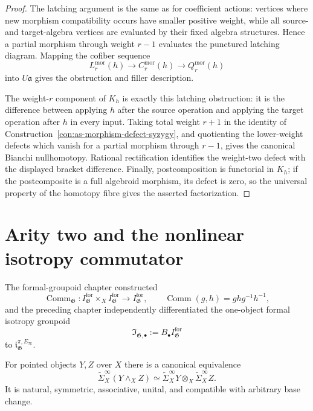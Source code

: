 \begin{proof}
The latching argument is the same as for coefficient actions: vertices where
new morphism compatibility occurs have smaller positive weight, while all
source- and target-algebra vertices are evaluated by their fixed algebra
structures.  Hence a partial morphism through weight $r-1$ evaluates the
punctured latching diagram.  Mapping the cofiber sequence
\[
    L_r^{\mathrm{mor}}(h)
    \longrightarrow
    C_r^{\mathrm{mor}}(h)
    \longrightarrow
    Q_r^{\mathrm{mor}}(h)
\]
into $U\mathfrak a$ gives the obstruction and filler description.

The weight-$r$ component of $K_h$ is exactly this latching obstruction: it is
the difference between applying $h$ after the source operation and applying
the target operation after $h$ in every input.  Taking total weight $r+1$ in
the identity of
Construction~\ref{con:as-morphism-defect-syzygy}, and quotienting the
lower-weight defects which vanish for a partial morphism through $r-1$, gives
the canonical Bianchi nullhomotopy.  Rational rectification identifies the
weight-two defect with the displayed bracket difference.  Finally,
postcomposition is functorial in $K_h$; if the postcomposite is a full
algebroid morphism, its defect is zero, so the universal property of the
homotopy fibre gives the asserted factorization.
\end{proof}

\section{Arity two and the nonlinear isotropy commutator}
\label{sec:as-binary-commutator}

The formal-groupoid chapter constructed
\[
    \operatorname{Comm}_{\mathfrak G}:
    I_{\mathfrak G}^{\mathrm{for}}
    \times_X
    I_{\mathfrak G}^{\mathrm{for}}
    \longrightarrow
    I_{\mathfrak G}^{\mathrm{for}},
    \qquad
    \operatorname{Comm}(g,h)=ghg^{-1}h^{-1},
\]
and the preceding chapter independently differentiated the one-object formal
isotropy groupoid
\[
    \mathfrak I_{\mathfrak G,\bullet}
    :=
    B_\bullet I_{\mathfrak G}^{\mathrm{for}}
\]
to
$\mathfrak i_{\mathfrak G}^{\pi,E_\infty}$.

\begin{lemma}
\label{lem:as-reduced-stabilization-monoidal}
For pointed objects $Y,Z$ over $X$ there is a canonical equivalence
\[
\boxed{
    \widetilde\Sigma_X^\infty(Y\wedge_XZ)
    \simeq
    \widetilde\Sigma_X^\infty Y
    \otimes_X
    \widetilde\Sigma_X^\infty Z.
}
\]
It is natural, symmetric, associative, unital, and compatible with arbitrary
base change.
\end{lemma}

